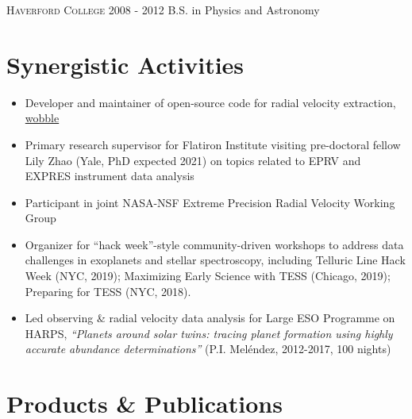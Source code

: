 \documentclass[letter,12pt]{article} %
\begin{document}
\textsc{Haverford College}  \hfill 2008 - 2012
\newline B.S. in Physics and Astronomy 

\section{Synergistic Activities}

\begin{itemize}
\item Developer and maintainer of open-source code for radial velocity extraction, \href{https://www.github.com/megbedell/wobble}{wobble}

\item Primary research supervisor for Flatiron Institute visiting pre-doctoral fellow Lily Zhao (Yale, PhD expected 2021) on topics related to EPRV and EXPRES instrument data analysis

\item Participant in joint NASA-NSF Extreme Precision Radial Velocity Working Group

\item Organizer for ``hack week''-style community-driven workshops to address data challenges in exoplanets and stellar spectroscopy, including Telluric Line Hack Week (NYC, 2019); Maximizing Early Science with TESS (Chicago, 2019); Preparing for TESS (NYC, 2018).

\item Led observing \& radial velocity data analysis for Large ESO Programme on HARPS, \textit{``Planets around solar twins: tracing planet formation using highly accurate abundance determinations''} (P.I. Mel\'{e}ndez, 2012-2017, 100 nights)

\end{itemize}



\section{Products \& Publications}
\end{document}

